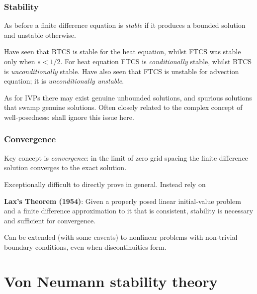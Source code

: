 \documentclass{beamer}
\begin{document}
\begin{frame}
  \frametitle{Stability}

  As before a finite difference equation is \emph{stable} if it
  produces a bounded solution and unstable otherwise. \pause

  \vspace{1ex}

  Have seen that BTCS is stable for the heat equation, whilst FTCS was
  stable only when $s < 1/2$. For heat equation FTCS is
  \emph{conditionally} stable, whilst BTCS is \emph{unconditionally}
  stable. \pause Have also seen that FTCS is unstable for advection
  equation; it is \emph{unconditionally unstable}. \pause

  \vspace{1ex}

  As for IVPs there may exist genuine unbounded solutions, and
  spurious solutions that swamp genuine solutions.  Often closely
  related to the complex concept of well-posedness: shall ignore this
  issue here.

\end{frame}

\begin{frame}
  \frametitle{Convergence}

  Key concept is \emph{convergence}: in the limit of zero grid spacing
  the finite difference solution converges to the exact
  solution. \pause

  \vspace{1ex}

  Exceptionally difficult to directly prove in general. \pause Instead
  rely on

  \vspace{2ex}

  {\bf Lax's Theorem (1954)}: Given a properly posed linear
  initial-value problem and a finite difference approximation to it
  that is consistent, stability is necessary and sufficient for
  convergence. \pause

  \vspace{2ex}

  Can be extended (with some caveats) to nonlinear problems with
  non-trivial boundary conditions, even when discontinuities form.

\end{frame}


\section{Von Neumann stability theory}
\end{document}
